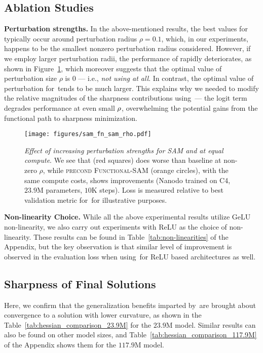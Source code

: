 \subsection{Ablation Studies}
\textbf{Perturbation strengths.} In the above-mentioned results, the best values for \SAM typically occur around perturbation radius $\rho=0.1$, which, in our experiments, happens to be the smallest nonzero perturbation radius considered. However, if we employ larger perturbation radii, the performance of \SAM rapidly deteriorates, as shown in Figure~\ref{fig:sam_fn_sam_rho}, which moreover suggests that the optimal value of perturbation size $\rho$ is $0$ --- i.e., \textit{not using \SAM at all}. In contrast, the optimal value of perturbation for \precond\,\funcSAM tends to be much larger.
This explains why we needed to modify the relative magnitudes of the sharpness contributions using \precond\,\funcSAM ---
the logit term degrades performance at even small $\rho$, overwhelming the potential gains from the functional path to sharpness minimization.

\begin{figure}[ht!]
\vskip 0.1in
\centering
\begin{center}
\centerline{\texttt{[image: figures/sam\_fn\_sam\_rho.pdf]}}
\caption{\textit{Effect of increasing perturbation strengths for \textcolor{samColor}{\textsc{SAM}} and  at equal compute}. We see that \SAM (red squares) does worse than baseline at non-zero $\rho$, while {\textsc{precond Functional-SAM}} (orange circles), with the same compute costs, shows improvements (Nanodo trained on C4, $23.9$M parameters, $10$K steps). Loss is measured relative to best validation metric for \precond\,\funcSAM for illustrative purposes.}
\label{fig:sam_fn_sam_rho}
\end{center}
\vskip -0.2in 
\end{figure}

\textbf{Non-linearity Choice.} While all the above experimental results utilize GeLU non-linearity, we also carry out experiments with ReLU as the choice of non-linearity. These results can be found in Table~\ref{tab:non-linearities} of the Appendix, but the key observation is that similar level of improvement is observed in the evaluation loss when using \precond\,\funcSAM for ReLU based architectures as well.   


\subsection{Sharpness of Final Solutions}
Here, we confirm that the generalization benefits imparted by \precond\,\funcSAM are brought about convergence to a solution with lower curvature, as shown in the Table~\ref{tab:hessian_comparison_23.9M} for the $23.9$M model. Similar results can also be found on other model sizes, and Table~\ref{tab:hessian_comparison_117.9M} of the Appendix shows them for the $117.9$M model.


